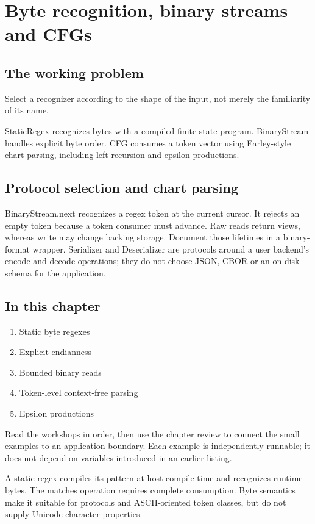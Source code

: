 \chapter{Byte recognition, binary streams and CFGs}\label{ch:10}
\section*{The working problem}
Select a recognizer according to the shape of the input, not merely the familiarity of its name.

StaticRegex recognizes bytes with a compiled finite-state program. BinaryStream handles explicit byte order. CFG consumes a token vector using Earley-style chart parsing, including left recursion and epsilon productions.

\section*{Protocol selection and chart parsing}
BinaryStream.next recognizes a regex token at the current cursor. It rejects an empty token because a token consumer must advance. Raw reads return views, whereas write may change backing storage. Document those lifetimes in a binary-format wrapper. Serializer and Deserializer are protocols around a user backend's encode and decode operations; they do not choose JSON, CBOR or an on-disk schema for the application.

\section*{In this chapter}
\begin{enumerate}
\item Static byte regexes
\item Explicit endianness
\item Bounded binary reads
\item Token-level context-free parsing
\item Epsilon productions
\end{enumerate}
Read the workshops in order, then use the chapter review to connect the small examples to an application boundary. Each example is independently runnable; it does not depend on variables introduced in an earlier listing.

\clearpage
{}
A static regex compiles its pattern at host compile time and recognizes runtime bytes. The matches operation requires complete consumption. Byte semantics make it suitable for protocols and ASCII-oriented token classes, but do not supply Unicode character properties.

